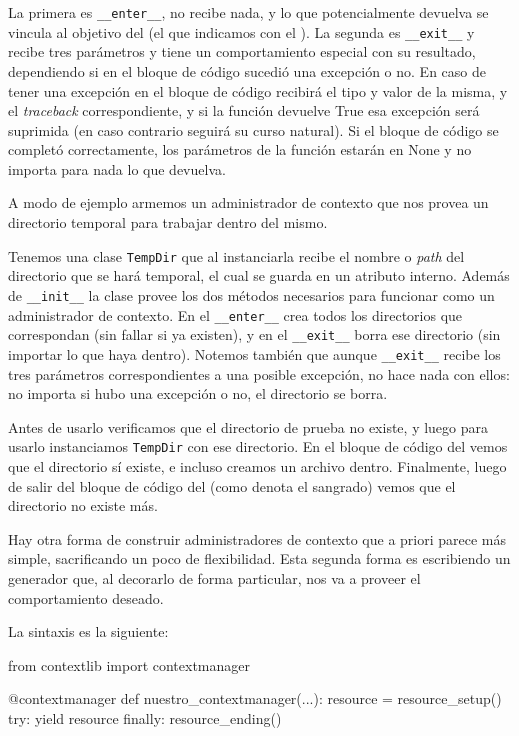 La primera es \verb|__enter__|, no recibe nada, y lo que potencialmente devuelva se vincula al objetivo del  (el que indicamos con el ). La segunda es \verb|__exit__| y recibe tres parámetros y tiene un comportamiento especial con su resultado, dependiendo si en el bloque de código sucedió una excepción o no. En caso de tener una excepción en el bloque de código recibirá el tipo y valor de la misma, y el \textit{traceback} correspondiente, y si la función devuelve True esa excepción será suprimida (en caso contrario seguirá su curso natural). Si el bloque de código se completó correctamente, los parámetros de la función estarán en None y no importa para nada lo que devuelva.

A modo de ejemplo armemos un administrador de contexto que nos provea un directorio temporal para trabajar dentro del mismo. 


Tenemos una clase \texttt{TempDir} que al instanciarla recibe el nombre o \textit{path} del directorio que se hará temporal, el cual se guarda en un atributo interno. Además de \verb|__init__| la clase provee los dos métodos necesarios para funcionar como un administrador de contexto. En el \verb|__enter__| crea todos los directorios que correspondan (sin fallar si ya existen), y en el \verb|__exit__| borra ese directorio (sin importar lo que haya dentro). Notemos también que aunque \verb|__exit__| recibe los tres parámetros correspondientes a una posible excepción, no hace nada con ellos: no importa si hubo una excepción o no, el directorio se borra.
 

Antes de usarlo verificamos que el directorio de prueba no existe, y luego para usarlo instanciamos \texttt{TempDir} con ese directorio. En el bloque de código del  vemos que el directorio sí existe, e incluso creamos un archivo dentro. Finalmente, luego de salir del bloque de código del  (como denota el sangrado) vemos que el directorio no existe más.

Hay otra forma de construir administradores de contexto que a priori parece más simple, sacrificando un poco de flexibilidad. Esta segunda forma es escribiendo un generador que, al decorarlo de forma particular, nos va a proveer el comportamiento deseado.

La sintaxis es la siguiente:

\begin{py}
from contextlib import contextmanager

@contextmanager
def nuestro_contextmanager(...):
    resource = resource_setup()
    try:
        yield resource
    finally:
        resource_ending()
\end{py}

